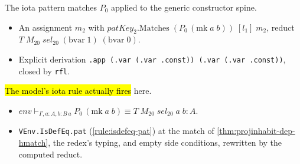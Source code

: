 \begin{example}
  \label{thm:projinhabit-dep-hmatch}
  \leanok

   The iota pattern matches $P_0$ applied to the generic constructor spine.
  \begin{itemize}
  \item An assignment $m_2$ with $\mathit{patKey}_2.\mathrm{Matches}\;(P_0\,(\mathrm{mk}\;a\;b))\;
        [l_1]\;m_2$, reduct $T\;M_{20}\;\mathit{sel}_{20}\;(\mathrm{bvar}\;1)\;(\mathrm{bvar}\;0)$.
  \item {} Explicit derivation \texttt{.app (.var (.var .const)) (.var (.var .const))},
        closed by \texttt{rfl}.
  \end{itemize}
\end{example}

\begin{example}
  \label{thm:projinhabit-dep-hiota}
  \leanok

   \hl{The model's iota rule actually fires} here.
  \begin{itemize}
  \item $\mathit{env}\vdash_{\Gamma,a{:}A,b{:}B\,a} P_0\,(\mathrm{mk}\;a\;b)\equiv T\;M_{20}\;
        \mathit{sel}_{20}\;a\;b:A$.
  \item {} \texttt{VEnv.IsDefEq.pat} (\ref{rule:isdefeq-pat}) at the match of
        \ref{thm:projinhabit-dep-hmatch}, the redex's typing, and empty side conditions,
        rewritten by the computed reduct.
  \end{itemize}
\end{example}

